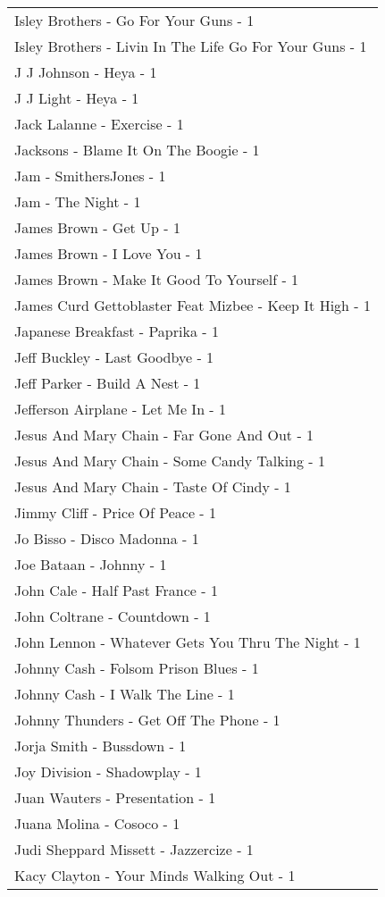 \documentclass[
]{article}
\begin{document}
\begin{longtable}{l}
Isley Brothers - Go For Your Guns - 1 \\ 
Isley Brothers - Livin In The Life Go For Your Guns - 1 \\ 
J J Johnson - Heya - 1 \\ 
J J Light - Heya - 1 \\ 
Jack Lalanne - Exercise - 1 \\ 
Jacksons - Blame It On The Boogie - 1 \\ 
Jam - SmithersJones - 1 \\ 
Jam - The Night - 1 \\ 
James Brown - Get Up - 1 \\ 
James Brown - I Love You - 1 \\ 
James Brown - Make It Good To Yourself - 1 \\ 
James Curd Gettoblaster Feat Mizbee - Keep It High - 1 \\ 
Japanese Breakfast - Paprika - 1 \\ 
Jeff Buckley - Last Goodbye - 1 \\ 
Jeff Parker - Build A Nest - 1 \\ 
Jefferson Airplane - Let Me In - 1 \\ 
Jesus And Mary Chain - Far Gone And Out - 1 \\ 
Jesus And Mary Chain - Some Candy Talking - 1 \\ 
Jesus And Mary Chain - Taste Of Cindy - 1 \\ 
Jimmy Cliff - Price Of Peace - 1 \\ 
Jo Bisso - Disco Madonna - 1 \\ 
Joe Bataan - Johnny - 1 \\ 
John Cale - Half Past France - 1 \\ 
John Coltrane - Countdown - 1 \\ 
John Lennon - Whatever Gets You Thru The Night - 1 \\ 
Johnny Cash - Folsom Prison Blues - 1 \\ 
Johnny Cash - I Walk The Line - 1 \\ 
Johnny Thunders - Get Off The Phone - 1 \\ 
Jorja Smith - Bussdown - 1 \\ 
Joy Division - Shadowplay - 1 \\ 
Juan Wauters - Presentation - 1 \\ 
Juana Molina - Cosoco - 1 \\ 
Judi Sheppard Missett - Jazzercize - 1 \\ 
Kacy Clayton - Your Minds Walking Out - 1 \\ 

\end{longtable}
\end{document}
